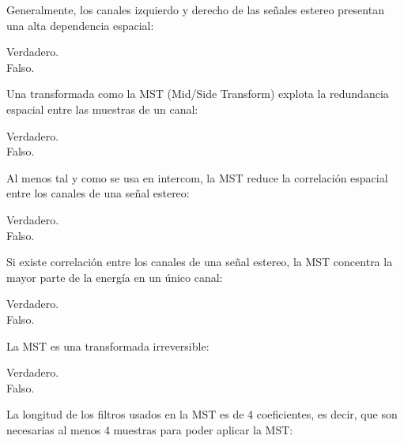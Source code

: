 \documentclass[legalpaper, 12pt, addpoints]{exam}
\begin{document}
\begin{questions}
\vspace{0.10in}

\question Generalmente, los canales izquierdo y derecho de las señales
estereo presentan una alta dependencia espacial:

\begin{oneparchoices}
  \choice Verdadero.\\
  \choice Falso.
\end{oneparchoices}
  
\vspace{0.10in}

\question Una transformada como la MST (Mid/Side Transform) explota la
redundancia espacial entre las muestras de un canal:

\begin{oneparchoices}
  \choice Verdadero.\\
  \choice Falso.
\end{oneparchoices}
  
\vspace{0.10in}

\question Al menos tal y como se usa en intercom, la MST reduce la correlación espacial entre los canales de una señal estereo:

\begin{oneparchoices}
  \choice Verdadero.\\
  \choice Falso.
\end{oneparchoices}
  
\vspace{0.10in}

\question Si existe correlación entre los canales de una señal estereo, la MST concentra la mayor parte de la energía en un único canal:

\begin{oneparchoices}
  \choice Verdadero.\\
  \choice Falso.
\end{oneparchoices}
  
\vspace{0.10in}

\question La MST es una transformada irreversible:

\begin{oneparchoices}
  \choice Verdadero.\\
  \choice Falso.
\end{oneparchoices}
  
\vspace{0.10in}

\question La longitud de los filtros usados en la MST es de 4 coeficientes, es decir, que son necesarias al menos 4 muestras para poder aplicar la MST:


\end{questions}
\end{document}
